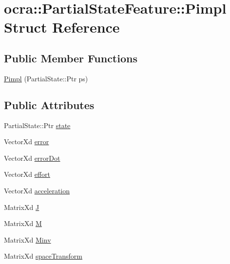 \hypertarget{structocra_1_1PartialStateFeature_1_1Pimpl}{}\section{ocra\+:\+:Partial\+State\+Feature\+:\+:Pimpl Struct Reference}
\label{structocra_1_1PartialStateFeature_1_1Pimpl}
\subsection*{Public Member Functions}
\begin{DoxyCompactItemize}
\item 
\hyperlink{structocra_1_1PartialStateFeature_1_1Pimpl_ab528ba7c9763bcdee5e89cca9a18defd}{Pimpl} (Partial\+State\+::\+Ptr ps)
\end{DoxyCompactItemize}
\subsection*{Public Attributes}
\begin{DoxyCompactItemize}
\item 
Partial\+State\+::\+Ptr \hyperlink{structocra_1_1PartialStateFeature_1_1Pimpl_a780cc4ecc5de8f231684ffdd394aa31a}{state}
\item 
Vector\+Xd \hyperlink{structocra_1_1PartialStateFeature_1_1Pimpl_a92618339173100da4f1759fca1c5de69}{error}
\item 
Vector\+Xd \hyperlink{structocra_1_1PartialStateFeature_1_1Pimpl_a761ba2024bc9792be9d3317ac0e7006e}{error\+Dot}
\item 
Vector\+Xd \hyperlink{structocra_1_1PartialStateFeature_1_1Pimpl_a9339429835a3f17dc250ebcb1a417de8}{effort}
\item 
Vector\+Xd \hyperlink{structocra_1_1PartialStateFeature_1_1Pimpl_a513530c5f57ebdd9b49fe5c7af683378}{acceleration}
\item 
Matrix\+Xd \hyperlink{structocra_1_1PartialStateFeature_1_1Pimpl_aa1bea74398a6c6774e4178c9a07585fc}{J}
\item 
Matrix\+Xd \hyperlink{structocra_1_1PartialStateFeature_1_1Pimpl_a72c1103a7217a32b0c3a987ee55ae4b8}{M}
\item 
Matrix\+Xd \hyperlink{structocra_1_1PartialStateFeature_1_1Pimpl_a7e2b177fca112bbeb8055361c90d333e}{Minv}
\item 
Matrix\+Xd \hyperlink{structocra_1_1PartialStateFeature_1_1Pimpl_aadd03df1276aa00d2efd8679c5cecb1a}{space\+Transform}
\end{DoxyCompactItemize}


